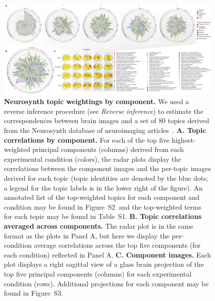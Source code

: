 \documentclass[english, 11pt]{article}
\newcommand{\topTerms}{S2}
\newcommand{\componentBrains}{S3}
\newcommand{\topics}{S1}
\providecommand{\DIFaddbegin}{} %
\providecommand{\DIFaddend}{} %
\providecommand{\DIFdelbegin}{} %
\providecommand{\DIFdelend}{} %
\providecommand{\DIFaddbeginFL}{} %
\providecommand{\DIFaddendFL}{} %
\providecommand{\DIFdelbeginFL}{} %
\providecommand{\DIFdelendFL}{} %
\newcommand{\DIFscaledelfig}{0.5}
\newlength{\DIFdelgraphicswidth} %
\newlength{\DIFdelgraphicsheight} %
\newcommand{\DIFaddincludegraphics}[2][]{{\color{blue}\fbox{\DIFOincludegraphics[#1]{#2}}}} %
\newcommand{\DIFdelincludegraphics}[2][]{%
\sbox{\DIFdelgraphicsbox}{\DIFOincludegraphics[#1]{#2}}%
\settoboxwidth{\DIFdelgraphicswidth}{\DIFdelgraphicsbox} %
\settoboxtotalheight{\DIFdelgraphicsheight}{\DIFdelgraphicsbox} %
\scalebox{\DIFscaledelfig}{%
\parbox[b]{\DIFdelgraphicswidth}{\usebox{\DIFdelgraphicsbox}\\[-\baselineskip] \rule{\DIFdelgraphicswidth}{0em}}\llap{\resizebox{\DIFdelgraphicswidth}{\DIFdelgraphicsheight}{%
\setlength{\unitlength}{\DIFdelgraphicswidth}%
\begin{picture}(1,1)%
\thicklines\linethickness{2pt} %
{\color[rgb]{1,0,0}\put(0,0){\framebox(1,1){}}}%
{\color[rgb]{1,0,0}\put(0,0){\line( 1,1){1}}}%
{\color[rgb]{1,0,0}\put(0,1){\line(1,-1){1}}}%
\end{picture}%
}\hspace*{3pt}}} %
} %
\DeclareRobustCommand{\DIFaddbegin}{\DIFOaddbegin \let\includegraphics\DIFaddincludegraphics} %
\DeclareRobustCommand{\DIFaddend}{\DIFOaddend \let\includegraphics\DIFOincludegraphics} %
\DeclareRobustCommand{\DIFdelbegin}{\DIFOdelbegin \let\includegraphics\DIFdelincludegraphics} %
\DeclareRobustCommand{\DIFdelend}{\DIFOaddend \let\includegraphics\DIFOincludegraphics} %
\DeclareRobustCommand{\DIFaddbeginFL}{\DIFOaddbeginFL \let\includegraphics\DIFaddincludegraphics} %
\DeclareRobustCommand{\DIFaddendFL}{\DIFOaddendFL \let\includegraphics\DIFOincludegraphics} %
\DeclareRobustCommand{\DIFdelbeginFL}{\DIFOdelbeginFL \let\includegraphics\DIFdelincludegraphics} %
\DeclareRobustCommand{\DIFdelendFL}{\DIFOaddendFL \let\includegraphics\DIFOincludegraphics} %
\begin{document}
\DIFdelbegin %
\DIFdelendFL \DIFaddbeginFL \begin{figure}
  \DIFaddendFL \centering
  \includegraphics[width=\textwidth]{figs/neurosynth_by_component}

\caption{\textbf{Neurosynth topic weightings by component.} We used a reverse
inference procedure (see \textit{Reverse inference}) to estimate the
correspondences between brain images and a set of 80 topics derived from the
Neurosynth database of neuroimaging articles~\citep{RubiEtal17}. \textbf{A.
Topic correlations by component.} For each of the top five highest-weighted
principal components (columns) derived from each experimental condition
(colors), the radar plots display the correlations between the component images
and the per-topic images derived for each topic (topic identities are denoted
by the blue dots; a legend for the topic labels is in the lower right of the
figure). An annotated list of the top-weighted topics for each component and
condition may be found in Figure~\topTerms~and the top-weighted terms for each
topic may be found in Table~\topics. \textbf{B. Topic correlations averaged
across components.} The radar plot is in the same format as the plots in Panel
A, but here we display the per-condition average correlations across the top
five components (for each condition) reflected in Panel A. \textbf{C. Component
images.} Each plot displays a right sagittal view of a glass brain projection of
the top five principal components (columns) for each experimental condition
(rows). Additional projections for each component may be found in
Figure~\componentBrains.}

\label{fig:neurosynth-pca}

\DIFdelbeginFL %
\DIFdelend \DIFaddbegin \end{figure}
\DIFaddend 
\end{document}
